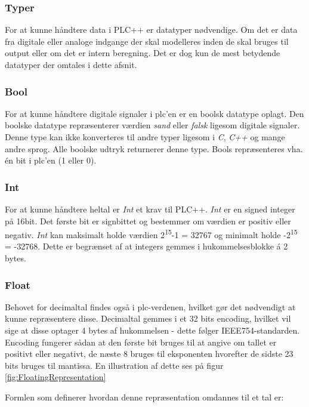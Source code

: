 \subsubsection{Typer}
For at kunne håndtere data i PLC++ er datatyper nødvendige. Om det er data fra digitale eller analoge indgange der skal modelleres inden de skal bruges til output eller om det er intern beregning. Det er dog kun de mest betydende datatyper der omtales i dette afsnit.

\subsubsection*{Bool}
For at kunne håndtere digitale signaler i \gls{plc}'en er en boolsk datatype oplagt. Den boolske datatype repræsenterer værdien \textit{sand} eller \textit{falsk} ligesom digitale signaler. Denne type kan ikke konverteres til andre typer ligesom i \textit{C}, \textit{C++} og mange andre sprog. Alle boolske udtryk returnerer denne type. Bools repræsenteres vha. én bit i \gls{plc}'en (1 eller 0). 

\subsubsection*{Int}
For at kunne håndtere heltal er \textit{Int} et krav til PLC++. \textit{Int} er en signed integer på 16bit. Det første bit er signbittet og bestemmer om værdien er positiv eller negativ. \textit{Int} kan maksimalt holde værdien 2\textsuperscript{15}-1 = 32767 og minimalt holde -2\textsuperscript{15} = -32768. Dette er begrænset af at integers gemmes i hukommelsesblokke á 2 bytes.

\subsubsection*{Float}
Behovet for decimaltal findes også i \gls{plc}-verdenen, hvilket gør det nødvendigt at kunne repræsentere disse. Decimaltal gemmes i et 32 bits encoding, hvilket vil sige at disse optager 4 bytes af hukommelsen - dette følger IEEE754-standarden. Encoding fungerer sådan at den første bit bruges til at angive om tallet er positivt eller negativt, de næste 8 bruges til eksponenten hvorefter de sidste 23 bits bruges til mantissa. En illustration af dette ses på figur \ref{fig:FloatingRepresentation}


Formlen som definerer hvordan denne repræsentation omdannes til et tal er:

